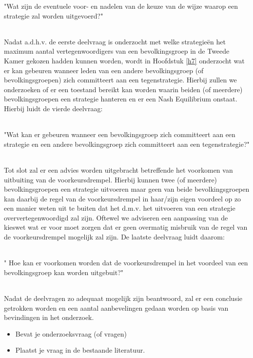 \begin{SDV}"Wat zijn de eventuele voor- en nadelen van de keuze van de wijze waarop een strategie zal worden uitgevoerd?"\\\
\end{SDV}

Nadat a.d.h.v. de eerste deelvraag is onderzocht met welke strategie\"{e}n het maximum aantal vertegenwoordigers van een bevolkingsgroep in de Tweede Kamer gekozen hadden kunnen worden, wordt in Hoofdstuk \ref{h7} onderzocht wat er kan gebeuren wanneer leden van een andere bevolkingsgroep (of bevolkingsgroepen) zich committeert aan een tegenstrategie. Hierbij zullen we onderzoeken of er een toestand bereikt kan worden waarin beiden (of meerdere) bevolkingsgroepen een strategie hanteren en er een Nash Equilibrium onstaat. Hierbij luidt de vierde deelvraag: \\\

\begin{DV}"Wat kan er gebeuren wanneer een bevolkingsgroep zich committeert aan een strategie en een andere bevolkingsgroep zich committeert aan een tegenstrategie?"\\\
\end{DV}

Tot slot zal er een advies worden uitgebracht betreffende het voorkomen van uitbuiting van de voorkeursdrempel. Hierbij kunnen twee (of meerdere) bevolkingsgroepen een strategie uitvoeren maar geen van beide bevolkingsgroepen kan daarbij de regel van de voorkeursdrempel in haar/zijn eigen voordeel op zo een manier weten uit te buiten dat het d.m.v. het uitvoeren van een strategie oververtegenwoordigd zal zijn. Oftewel we adviseren een aanpassing van de kieswet wat er voor moet zorgen dat er geen overmatig misbruik van de regel van de voorkeursdrempel mogelijk zal zijn. De laatste deelvraag luidt daarom: \\\

\begin{DV}" Hoe kan er voorkomen worden dat de voorkeursdrempel in het voordeel van een bevolkingsgroep kan worden uitgebuit?"\\\
\end{DV}

Nadat de deelvragen zo adequaat mogelijk zijn beantwoord, zal er een conclusie getrokken worden en een aantal aanbevelingen gedaan worden op basis van bevindingen in het onderzoek. 






\iffalse
\begin{itemize}
\item Bevat je onderzoeksvraag (of vragen)
\item Plaatst je vraag in de bestaande literatuur.
\end{itemize}

